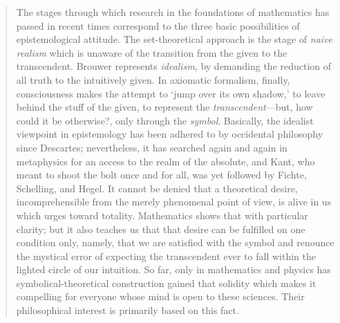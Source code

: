\begin{quote}
    The stages through which research in the foundations of mathematics has passed in recent times correspond to the three basic possibilities of epistemological attitude.  The set-theoretical approach is the stage of \emph{naive realism} which is unaware of the transition from the given to the transcendent.  Brouwer represents \emph{idealism}, by demanding the reduction of all truth to the intuitively given.  In axiomatic formalism, finally, consciousness makes the attempt to `jump over its own shadow,' to leave behind the stuff of the given, to represent the \emph{transcendent}---but, how could it be otherwise?, only through the \emph{symbol}.  Basically, the idealist viewpoint in epistemology has been adhered to by occidental philosophy since Descartes; nevertheless, it has searched again and again in metaphysics for an access to the realm of the absolute, and Kant, who meant to shoot the bolt once and for all, was yet followed by Fichte, Schelling, and Hegel.  It cannot be denied that a theoretical desire, incomprehensible from the merely phenomenal point of view, is alive in us which urges toward totality. Mathematics shows that with particular clarity; but it also teaches us that that desire can be fulfilled on one condition only, namely, that we are satisfied with the symbol and renounce the mystical error of expecting the transcendent ever to fall within the lighted circle of our intuition.  So far, only in mathematics and physics has symbolical-theoretical construction gained that solidity which makes it compelling for everyone whose mind is open to these sciences.  Their philosophical interest is primarily based on this fact.

    \citep[p. 65-66]{Weyl1949}
\end{quote}





